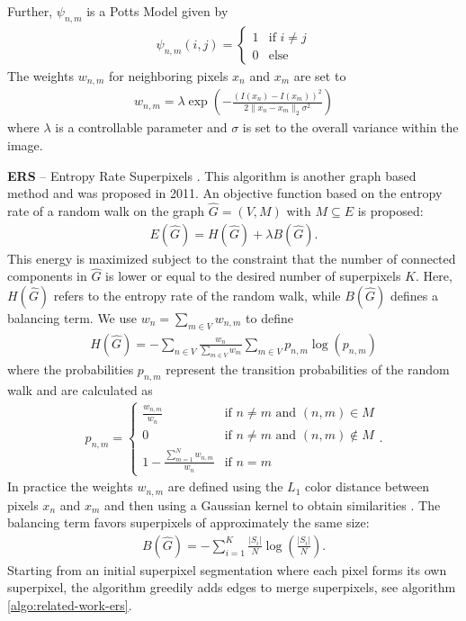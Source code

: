 Further, $\psi_{n,m}$ is a Potts Model given by
\begin{align}
	\psi_{n, m} (i, j) = \begin{cases}
		1 & \text{if } i \neq j\\
		0 & \text{else}
	\end{cases}
\end{align}
The weights $w_{n,m}$ for neighboring pixels $x_n$ and $x_m$ are set to
\begin{align}
	\label{eq:related-work-cis-weights}
	w_{n,m} = \lambda \exp\left( - \frac{(I(x_n) - I(x_m))^2}{2 \|x_n - x_m\|_2 \sigma^2} \right)
\end{align}
where $\lambda$ is a controllable parameter and $\sigma$ is set to the overall variance within the image. 

\textbf{ERS} -- Entropy Rate Superpixels \cite{LiuTuzelRamalingamChellappa:2011}. This algorithm is another graph based method and was proposed in 2011. An objective function based on the entropy rate of a random walk on the graph $\hat{G} = (V, M)$ with $M \subseteq E$ is proposed:
\begin{align}
	\label{eq:related-work-ers-energy}
	E(\hat{G}) = H(\hat{G}) + \lambda B(\hat{G}).
\end{align}
This energy is maximized subject to the constraint that the number of connected components in $\hat{G}$ is lower or equal to the desired number of superpixels $K$. Here, $H(\hat{G})$ refers to the entropy rate of the random walk, while $B(\hat{G})$ defines a balancing term. We use $w_n = \sum_{m \in V} w_{n,m}$ to define
\begin{align}
	H(\hat{G}) = - \sum_{n \in V} \frac{w_n}{\sum_{m \in V} w_m} \sum_{m \in V} p_{n,m} \log(p_{n,m})
\end{align}
where the probabilities $p_{n,m}$ represent the transition probabilities of the random walk and are calculated as
\begin{align}
	p_{n,m} = \begin{cases}
		\frac{w_{n,m}}{w_n} & \text{if } n \neq m \text{ and } (n,m) \in M\\
		0 & \text{if } n \neq m \text{ and } (n,m) \notin M\\
		1 - \frac{\sum_{m = 1}^N w_{n,m}}{w_n} & \text{if } n = m
	\end{cases}.
\end{align}
In practice the weights $w_{n,m}$ are defined using the $L_1$ color distance between pixels $x_n$ and $x_m$ and then using a Gaussian kernel to obtain similarities \cite{LiuTuzelRamalingamChellappa:2011}. The balancing term favors superpixels of approximately the same size:
\begin{align}
	B(\hat{G}) = - \sum_{i = 1}^K \frac{|S_i|}{N} \log\left(\frac{|S_i|}{N}\right).
\end{align}
Starting from an initial superpixel segmentation where each pixel forms its own superpixel, the algorithm greedily adds edges to merge superpixels, see algorithm \ref{algo:related-work-ers}.

